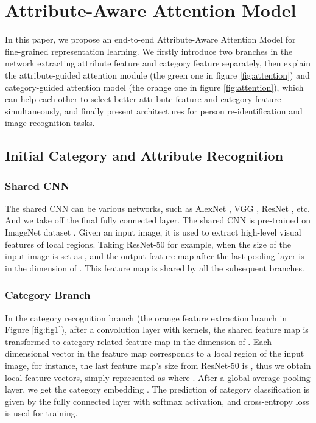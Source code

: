 \documentclass[sigconf]{acmart}
\begin{document}
\section{Attribute-Aware Attention Model}
In this paper, we propose an end-to-end Attribute-Aware Attention Model for fine-grained representation learning. We firstly introduce two branches in the network extracting attribute feature and category feature separately, then explain the attribute-guided attention module (the green one in figure \ref{fig:attention}) and category-guided attention model (the orange one in figure \ref{fig:attention}), which can help each other to select better attribute feature and category feature simultaneously, and finally present  architectures for person re-identification and image recognition tasks.

\subsection{Initial Category and Attribute Recognition}
\subsubsection{Shared CNN}
The shared CNN can be various networks, such as AlexNet \cite{Krizhevsky2012ImageNet}, VGG \cite{simonyan2014very}, ResNet \cite{he2016deep}, etc. And we take off the final fully connected layer. The shared CNN is pre-trained on ImageNet dataset \cite{russakovsky2015imagenet}. Given an input image, it is used to extract high-level visual features of local regions. Taking ResNet-50 for example, when the size of the input image is set as , and the output feature map after the last pooling layer is in the dimension of . This feature map is shared by all the subsequent branches.

\subsubsection{Category Branch}
In the category recognition branch (the orange feature extraction branch in Figure \ref{fig:fig1}), after a convolution layer with   kernels, the shared feature map is transformed to category-related feature map in the dimension of . Each -dimensional vector in the feature map corresponds to a local region of the input image, for instance, the last feature map's size from ResNet-50 is , thus we obtain  local feature vectors, simply represented as  where . After a global average pooling layer, we get the category embedding . The prediction of category classification is given by the fully connected layer with softmax activation, and cross-entropy loss is used for training.
\end{document}
